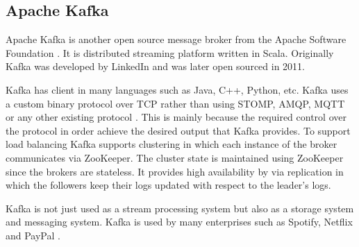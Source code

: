 \subsection{Apache Kafka}

Apache Kafka is another open source message broker from the Apache Software Foundation \parencite{kafka_official_site}. It is distributed streaming platform written in Scala. Originally Kafka was developed by LinkedIn and was later open sourced in 2011. 

Kafka has client in many languages \parencite{kafka_official_wiki} such as Java, C++, Python, etc.
Kafka uses a custom binary protocol over TCP rather than using STOMP, AMQP, MQTT or any other existing protocol \parencite{kafka_protocol}. This is mainly because the required control over the protocol in order achieve the desired output that Kafka provides. To support load balancing Kafka supports clustering \parencite{garg2013apache} in which each instance of the broker communicates via ZooKeeper. The cluster state is maintained using ZooKeeper since the brokers are stateless. It provides high availability by via replication in which the followers keep their logs updated with respect to the leader's logs. 

Kafka is not just used as a stream processing system but also as a storage system and messaging system. Kafka is used by many enterprises such as Spotify, Netflix and PayPal \parencite{kafka_users}.